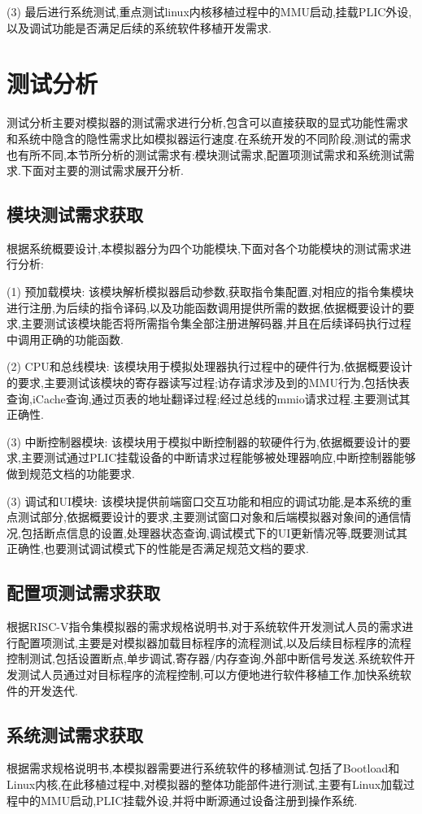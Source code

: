 (3) 最后进行系统测试,重点测试linux内核移植过程中的MMU启动,挂载PLIC外设,以及调试功能是否满足后续的系统软件移植开发需求.


\section{测试分析}
测试分析主要对模拟器的测试需求进行分析,包含可以直接获取的显式功能性需求和系统中隐含的隐性需求比如模拟器运行速度.在系统开发的不同阶段,测试的需求也有所不同,本节所分析的测试需求有:模块测试需求,配置项测试需求和系统测试需求.下面对主要的测试需求展开分析.

\subsection{模块测试需求获取}
根据系统概要设计,本模拟器分为四个功能模块,下面对各个功能模块的测试需求进行分析:


(1) 预加载模块: 该模块解析模拟器启动参数,获取指令集配置,对相应的指令集模块进行注册,为后续的指令译码,以及功能函数调用提供所需的数据,依据概要设计的要求,主要测试该模块能否将所需指令集全部注册进解码器,并且在后续译码执行过程中调用正确的功能函数.


(2) CPU和总线模块: 该模块用于模拟处理器执行过程中的硬件行为,依据概要设计的要求,主要测试该模块的寄存器读写过程;访存请求涉及到的MMU行为,包括快表查询,iCache查询,通过页表的地址翻译过程;经过总线的mmio请求过程.主要测试其正确性.


(3) 中断控制器模块: 该模块用于模拟中断控制器的软硬件行为,依据概要设计的要求,主要测试通过PLIC挂载设备的中断请求过程能够被处理器响应,中断控制器能够做到规范文档的功能要求.

(3) 调试和UI模块: 该模块提供前端窗口交互功能和相应的调试功能,是本系统的重点测试部分,依据概要设计的要求,主要测试窗口对象和后端模拟器对象间的通信情况,包括断点信息的设置,处理器状态查询,调试模式下的UI更新情况等,既要测试其正确性,也要测试调试模式下的性能是否满足规范文档的要求.


\subsection{配置项测试需求获取}
根据RISC-V指令集模拟器的需求规格说明书,对于系统软件开发测试人员的需求进行配置项测试,主要是对模拟器加载目标程序的流程测试,以及后续目标程序的流程控制测试,包括设置断点,单步调试,寄存器/内存查询,外部中断信号发送.系统软件开发测试人员通过对目标程序的流程控制,可以方便地进行软件移植工作,加快系统软件的开发迭代.

\subsection{系统测试需求获取}
根据需求规格说明书,本模拟器需要进行系统软件的移植测试.包括了Bootload和Linux内核,在此移植过程中,对模拟器的整体功能部件进行测试,主要有Linux加载过程中的MMU启动,PLIC挂载外设,并将中断源通过设备注册到操作系统.

